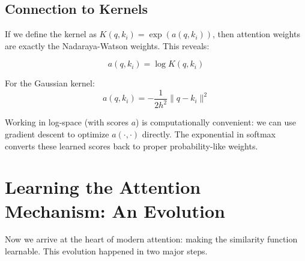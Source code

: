 \documentclass{article}
\begin{document}
\subsection{Connection to Kernels}

If we define the kernel as $K(q, k_i) = \exp(a(q, k_i))$, then attention weights are exactly the Nadaraya-Watson weights. This reveals:

\begin{equation}
a(q, k_i) = \log K(q, k_i)
\end{equation}

For the Gaussian kernel:
\begin{equation}
a(q, k_i) = -\frac{1}{2h^2}\|q - k_i\|^2
\end{equation}

Working in log-space (with scores $a$) is computationally convenient: we can use gradient descent to optimize $a(\cdot, \cdot)$ directly. The exponential in softmax converts these learned scores back to proper probability-like weights.

\section{Learning the Attention Mechanism: An Evolution}

Now we arrive at the heart of modern attention: making the similarity function learnable. This evolution happened in two major steps.
\end{document}
